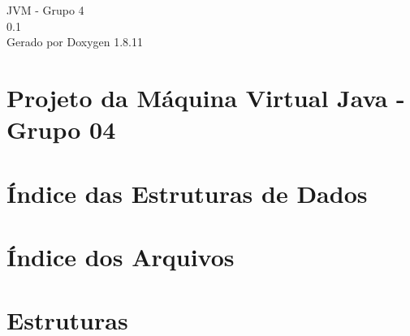 \documentclass[twoside]{book}
\newcommand{\+}{\discretionary{\mbox{\scriptsize$\hookleftarrow$}}{}{}}
\newcommand{\clearemptydoublepage}{%
  \newpage{\pagestyle{empty}\cleardoublepage}%
}
\begin{document}
\hypersetup{pageanchor=false,
             bookmarksnumbered=true,
             pdfencoding=unicode
            }
\begin{titlepage}
\vspace*{7cm}
\begin{center}%
{\Large J\+VM -\/ Grupo 4 \\[1ex]\large 0.\+1 }\\
\vspace*{1cm}
{\large Gerado por Doxygen 1.8.11}\\
\end{center}
\end{titlepage}
\clearemptydoublepage
\tableofcontents
\clearemptydoublepage
{}
\hypersetup{pageanchor=true}

\chapter{Projeto da Máquina Virtual Java -\/ Grupo 04}
\label{index}\hypertarget{index}{}
\chapter{Índice das Estruturas de Dados}

\chapter{Índice dos Arquivos}

\chapter{Estruturas}














































\end{document}
